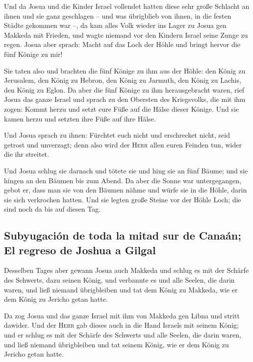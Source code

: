  Und da Josua und die Kinder Israel vollendet hatten
diese sehr große Schlacht an ihnen und sie ganz geschlagen -- und was
übrigblieb von ihnen, in die festen Städte gekommen war --,
 da kam alles Volk wieder ins Lager zu Josua gen Makkeda
mit Frieden, und wagte niemand vor den Kindern Israel seine Zunge zu
regen.  Josua aber sprach: Macht auf das Loch der Höhle
und bringt hervor die fünf Könige zu mir!

 Sie taten also und brachten die fünf Könige zu ihm aus
der Höhle: den König zu Jerusalem, den König zu Hebron, den König zu
Jarmuth, den König zu Lachis, den König zu Eglon.  Da
aber die fünf Könige zu ihm herausgebracht waren, rief Josua das ganze
Israel und sprach zu den Obersten des Kriegsvolks, die mit ihm zogen:
Kommt herzu und setzt eure Füße auf die Hälse dieser Könige. Und sie
kamen herzu und setzten ihre Füße auf ihre Hälse.

 Und Josua sprach zu ihnen: Fürchtet euch nicht und
erschrecket nicht, seid getrost und unverzagt; denn also wird der
\textsc{Herr} allen euren Feinden tun, wider die ihr streitet.

 Und Josua schlug sie darnach und tötete sie und hing sie
an fünf Bäume; und sie hingen an den Bäumen bis zum Abend.
 Da aber die Sonne war untergegangen, gebot er, dass man
sie von den Bäumen nähme und würfe sie in die Höhle, darin sie sich
verkrochen hatten. Und sie legten große Steine vor der Höhle Loch; die
sind noch da bis auf diesen Tag.

\hypertarget{subyugaciuxf3n-de-toda-la-mitad-sur-de-canauxe1n-el-regreso-de-joshua-a-gilgal}{%
\subsection{Subyugación de toda la mitad sur de Canaán; El regreso de
Joshua a
Gilgal}\label{subyugaciuxf3n-de-toda-la-mitad-sur-de-canauxe1n-el-regreso-de-joshua-a-gilgal}}

 Desselben Tages aber gewann Josua auch Makkeda und
schlug es mit der Schärfe des Schwerts, dazu seinen König, und verbannte
es und alle Seelen, die darin waren, und ließ niemand übrigbleiben und
tat dem König zu Makkeda, wie er dem König zu Jericho getan hatte.

 Da zog Josua und das ganze Israel mit ihm von Makkeda
gen Libna und stritt dawider.  Und der \textsc{Herr} gab
dieses auch in die Hand Israels mit seinem König; und er schlug es mit
der Schärfe des Schwerts und alle Seelen, die darin waren, und ließ
niemand übrigbleiben und tat seinem König, wie er dem König zu Jericho
getan hatte.

